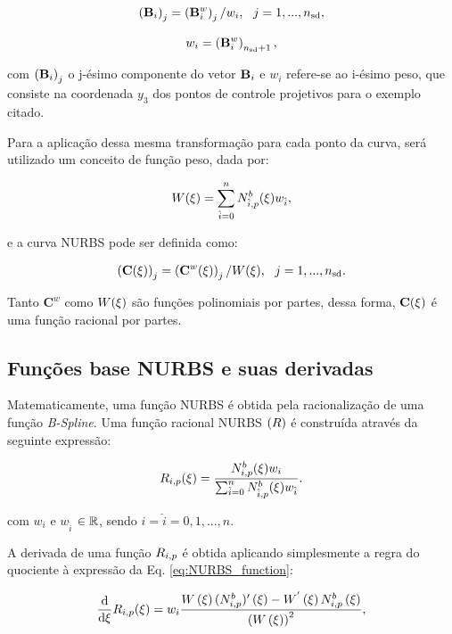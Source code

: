\documentclass[tese_patricia]{subfiles}
\begin{document}
\begin{align}
	\left(\mathbf{B}_i\right)_j = \left(\mathbf{B}^w_i\right)_j/w_i, \ \ j=1,...,{n_{\mathrm{sd}}} ,
\end{align}

\begin{align}
	w_i =   \left(\mathbf{B}^w_i\right)_{{n_{\mathrm{sd}}}+1},
\end{align}

\noindent com $\left(\mathbf{B}_i\right)_j$ o j-ésimo componente do vetor $\mathbf{B}_i$ e $w_i$ refere-se ao i-ésimo peso, que consiste na coordenada $y_3$ dos pontos de controle projetivos para o exemplo citado.

Para a aplicação dessa mesma transformação para cada ponto da curva, será utilizado um conceito de função peso, dada por:

\begin{align}
	W(\xi) = \sum_{\hat{i}=0}^{n}N^b_{\hat{i},p}(\xi)w_{\hat{i}},
\end{align}

e a curva NURBS pode ser definida como:

\begin{align}
	\left(\mathbf{C}(\xi)\right)_j = \left(\mathbf{C}^w(\xi)\right)_j/W(\xi), \ \ j = 1,...,{n_{\mathrm{sd}}}.
\end{align}

Tanto $\mathbf{C}^w$ como $W(\xi)$ são funções polinomiais por partes, dessa forma, $\mathbf{C}(\xi)$ é uma função racional por partes.

\subsection{Funções base NURBS e suas derivadas}

Matematicamente, uma função NURBS é obtida pela racionalização de uma função \textit{B-Spline}. Uma função racional NURBS $\left(R\right)$ é construída através da seguinte expressão:

\begin{align}
R_{i,p}(\xi) = \frac{N^b_{i,p}(\xi)w_i}{\sum_{\hat{i}=0}^{n}N^b_{\hat{i},p}(\xi)w_{\hat{i}}}.  \label{eq:NURBS_function}
\end{align}

\noindent com $w_{i}$ e $w_{\hat{i}}$ $\in \mathbb{R}$, sendo $i = \hat{i} =  0, 1, ... , n$.

A derivada de uma função $R_{i,p}$ é obtida aplicando simplesmente a regra do quociente à expressão da Eq. \ref{eq:NURBS_function}:

\begin{align}
	\frac{\mathrm{d}}{\mathrm{d} \xi} R_{i,p}(\xi) = w_{i} \frac{W\left(\xi\right)(N^{b}_{i,p})'\left(\xi\right) - W^{'}\left(\xi\right)N^b_{i,p}\left(\xi\right)}{\left(W\left(\xi\right)\right)^2},
\end{align}
\end{document}
